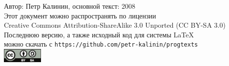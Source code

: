 \documentclass[a4paper,10pt]{problems}
\begin{document}
\begin{flushright}
Автор: Петр Калинин, основной текст: 2008\\
Этот документ можно распространять по лицензии\\
Creative Commons Attribution-ShareAlike 3.0 Unported (CC BY-SA 3.0)\\
Последнюю версию, а также исходный код для системы \LaTeX\\
можно скачать с \verb`https://github.com/petr-kalinin/progtexts`\\
\includegraphics[width=2cm]{by-sa-corr.eps}
\end{flushright}




\immediate\closeout\tsk
\immediate\closeout\hnt
\immediate\closeout\ans
\eject{}

\eject{}

\end{document}
